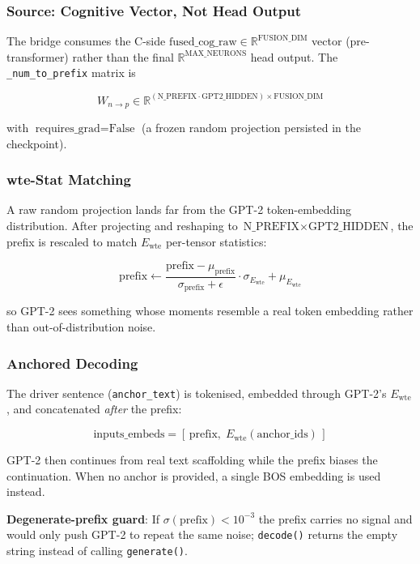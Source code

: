 \documentclass[12pt]{article}
\begin{document}
\subsubsection{Source: Cognitive Vector, Not Head Output}

The bridge consumes the C-side $\text{fused\_cog\_raw} \in
\mathbb{R}^{\text{FUSION\_DIM}}$ vector (pre-transformer) rather than
the final $\mathbb{R}^{\text{MAX\_NEURONS}}$ head output. The
\texttt{\_num\_to\_prefix} matrix is

\[
  W_{n\rightarrow p} \in \mathbb{R}^{
    (\text{N\_PREFIX}\cdot\text{GPT2\_HIDDEN}) \times \text{FUSION\_DIM}}
\]

with $\text{requires\_grad}=\text{False}$ (a frozen random projection
persisted in the checkpoint).

\subsubsection{wte-Stat Matching}

A raw random projection lands far from the GPT-2 token-embedding
distribution. After projecting and reshaping to $\text{N\_PREFIX} \times
\text{GPT2\_HIDDEN}$, the prefix is rescaled to match
$E_{\text{wte}}$ per-tensor statistics:

\[
  \text{prefix} \leftarrow \frac{\text{prefix} - \mu_{\text{prefix}}}
                                {\sigma_{\text{prefix}} + \epsilon}
                          \cdot \sigma_{E_{\text{wte}}}
                          + \mu_{E_{\text{wte}}}
\]

so GPT-2 sees something whose moments resemble a real token embedding
rather than out-of-distribution noise.

\subsubsection{Anchored Decoding}

The driver sentence (\texttt{anchor\_text}) is tokenised, embedded
through GPT-2's $E_{\text{wte}}$, and concatenated \emph{after} the
prefix:

\[
  \text{inputs\_embeds} = [\,\text{prefix},\; E_{\text{wte}}
                          (\text{anchor\_ids})\,]
\]

GPT-2 then continues from real text scaffolding while the prefix
biases the continuation. When no anchor is provided, a single BOS
embedding is used instead.

\textbf{Degenerate-prefix guard}: If $\sigma(\text{prefix}) < 10^{-3}$
the prefix carries no signal and would only push GPT-2 to repeat the
same noise; \texttt{decode()} returns the empty string instead of
calling \texttt{generate()}.
\end{document}
